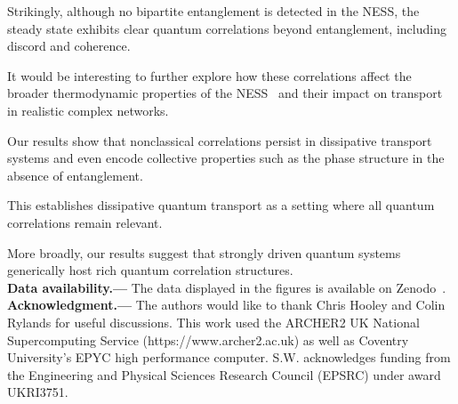 \documentclass[aps,prl,twocolumn,groupedaddress,superscriptaddress,colorlinks,bookmarks=false,citecolor=darkspringgreen,linkcolor=darkolivegreen,urlcolor=navyblue]{revtex4-1}
\begin{document}
Strikingly, although no bipartite entanglement is detected in the NESS, the steady state exhibits clear quantum correlations beyond entanglement, including discord and coherence.

It would be interesting to further explore how these correlations affect the broader thermodynamic properties of the NESS~\cite{Stra17} and their impact on transport in realistic complex networks.

Our results show that nonclassical correlations persist in dissipative transport systems and even encode collective properties such as the phase structure in the absence of entanglement.

This establishes dissipative quantum transport as a setting where all quantum correlations remain relevant.

More broadly, our results suggest that strongly driven quantum systems generically host rich quantum correlation structures.\\





{\bf Data availability.---} The data displayed in the figures is available on Zenodo~\cite{zenodo}.\\


{\bf Acknowledgment.---}
The authors would like to thank Chris Hooley and Colin Rylands for useful discussions.
This work used the ARCHER2 UK National Supercomputing Service (https://www.archer2.ac.uk) as well as Coventry University's EPYC high performance computer.
S.W. acknowledges funding from the Engineering and Physical Sciences Research Council (EPSRC) under award UKRI3751.





\clearpage





















\setcounter{equation}{0}
\setcounter{figure}{0}
\setcounter{table}{0}
\makeatletter
\renewcommand{\theequation}{S\arabic{equation}}
\renewcommand{\thefigure}{S\arabic{figure}}
\makeatletter
\onecolumngrid
\newpage
\end{document}
